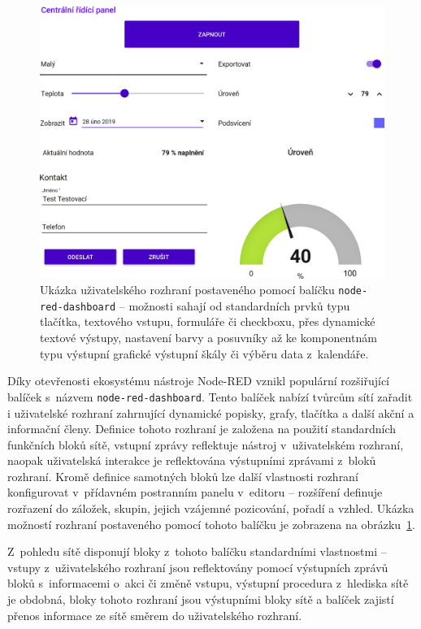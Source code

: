 \begin{figure}[th]
    \centering
    \includegraphics[width=\textwidth]{figures/node-red-dashboard.png}
    \caption{Ukázka uživatelského rozhraní postaveného pomocí balíčku \texttt{node-red-dashboard} -- možnosti sahají
    od standardních prvků typu tlačítka, textového vstupu, formuláře či checkboxu, přes dynamické textové výstupy,
    nastavení barvy a posuvníky až ke komponentnám typu výstupní grafické výstupní škály či výběru data z~kalendáře.}
    \label{fig:node-red-dashboard}
\end{figure}

Díky otevřenosti ekosystému nástroje Node-RED vznikl populární rozšiřující balíček s~názvem
\texttt{node-red-dashboard}.
Tento balíček nabízí tvůrcům sítí zařadit i uživatelské rozhraní zahrnující dynamické
popisky, grafy, tlačítka a další akční a informační členy.
Definice tohoto rozhraní je založena na použití standardních funkčních bloků sítě, vstupní zprávy reflektuje nástroj
v~uživatelském rozhraní, naopak uživatelská interakce je reflektována výstupními zprávami z~bloků rozhraní.
Kromě definice samotných bloků lze další vlastnosti rozhraní konfigurovat v~přídavném postranním panelu v~editoru --
rozšíření definuje rozřazení do záložek, skupin, jejich vzájemné pozicování, pořadí a vzhled.
Ukázka možností rozhraní postaveného pomocí tohoto balíčku je zobrazena na obrázku~\ref{fig:node-red-dashboard}.

Z~pohledu sítě disponují bloky z~tohoto balíčku standardními vlastnostmi -- vstupy z~uživatelského rozhraní jsou
reflektovány pomocí výstupních zprávů bloků s~informacemi o~akci či změně vstupu, výstupní procedura z~hlediska sítě
je obdobná, bloky tohoto rozhraní jsou výstupními bloky sítě a balíček zajistí přenos informace ze sítě směrem do
uživatelského rozhraní.

